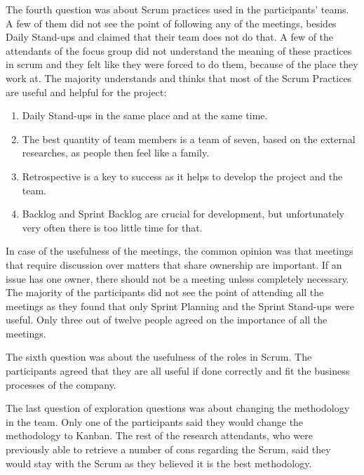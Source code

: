 The fourth question was about Scrum practices used in the participants' teams. A few of them did not see the point of following any of the meetings, besides Daily Stand-ups and claimed that their team does not do that. A few of the attendants of the focus group did not understand the meaning of these practices in scrum and they felt like they were forced to do them, because of the place they work at. The majority understands and thinks that most of the Scrum Practices are useful and helpful for the project:
\begin{enumerate}
    \item Daily Stand-ups in the same place and at the same time.
    \item The best quantity of team members is a team of seven, based on the external researches, as people then feel like a family.
    \item Retrospective is a key to success as it helps to develop the project and the team.
    \item Backlog and Sprint Backlog are crucial for development, but unfortunately very often there is too little time for that.
\end{enumerate}

In case of the usefulness of the meetings, the common opinion was that meetings that require discussion over matters that share ownership are important. If an issue has one owner, there should not be a meeting unless completely necessary. The majority of the participants did not see the point of attending all the meetings as they found that only Sprint Planning and the Sprint Stand-ups were useful. Only three out of twelve people agreed on the importance of all the meetings.

The sixth question was about the usefulness of the roles in Scrum. The participants agreed that they are all useful if done correctly and fit the business processes of the company.

The last question of exploration questions was about changing the methodology in the team. Only one of the participants said they would change the methodology to Kanban. The rest of the research attendants, who were previously able to retrieve a number of cons regarding the Scrum, said they would stay with the Scrum as they believed it is the best methodology.

